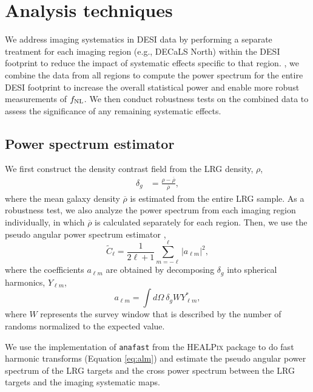 \section{Analysis techniques}
\label{sec:method} 
We address imaging systematics in DESI data by performing a separate treatment for each imaging region (e.g., DECaLS North) within the DESI footprint to reduce the impact of systematic effects specific to that region. , we combine the data from all regions to compute the power spectrum for the entire DESI footprint to increase the overall statistical power and enable more robust measurements of $f_{\rm NL}$. We then conduct robustness tests on the combined data to assess the significance of any remaining systematic effects.


\subsection{Power spectrum estimator}
We first construct the density contrast field from the LRG density, $\rho$,
\begin{align}\label{eq:delta}
    \delta_{g} &= \frac{\rho- \overline{\rho}}{\overline{\rho}},
\end{align}
where the mean galaxy density $\overline{\rho}$ is estimated from the entire LRG sample. As a robustness test, we also analyze the power spectrum from each imaging region individually, in which $\overline{\rho}$ is calculated separately for each region. Then, we use the pseudo angular power spectrum estimator \citep{hivon2002master},
\begin{equation}\label{eq:pusedocell}
        \tilde{C}_{\ell} = \frac{1}{2\ell +1} \sum_{m=-\ell}^{\ell} |a_{\ell m}|^{2},
\end{equation}
where the coefficients $a_{\ell m}$ are obtained by decomposing $\delta_{g}$ into spherical harmonics, $Y_{\ell m}$,
\begin{equation}\label{eq:alm}
        a_{\ell m} = \int d\Omega ~ \delta_{g} W Y^{*}_{\ell m},
\end{equation}
where $W$ represents the survey window that is described by the number of randoms normalized to the expected value.

We use the implementation of \texttt{anafast} from the \textsc{HEALPix} package \citep{gorski2005healpix} to do fast harmonic transforms (Equation \ref{eq:alm}) and estimate the pseudo angular power spectrum of the LRG targets and the cross power spectrum between the LRG targets and the imaging systematic maps.


